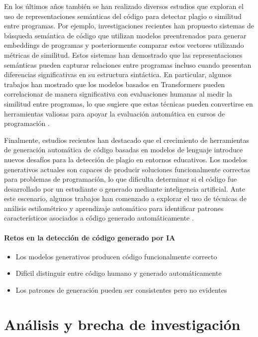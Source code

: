 En los últimos años también se han realizado diversos estudios que exploran el uso de representaciones semánticas del código para detectar plagio o similitud entre programas. Por ejemplo, investigaciones recientes han propuesto sistemas de búsqueda semántica de código que utilizan modelos preentrenados para generar embeddings de programas y posteriormente comparar estos vectores utilizando métricas de similitud. Estos sistemas han demostrado que las representaciones semánticas pueden capturar relaciones entre programas incluso cuando presentan diferencias significativas en su estructura sintáctica. En particular, algunos trabajos han mostrado que los modelos basados en Transformers pueden correlacionar de manera significativa con evaluaciones humanas al medir la similitud entre programas, lo que sugiere que estas técnicas pueden convertirse en herramientas valiosas para apoyar la evaluación automática en cursos de programación \cite{Ebrahim2024Semantic}.

Finalmente, estudios recientes han destacado que el crecimiento de herramientas de generación automática de código basadas en modelos de lenguaje introduce nuevos desafíos para la detección de plagio en entornos educativos. Los modelos generativos actuales son capaces de producir soluciones funcionalmente correctas para problemas de programación, lo que dificulta determinar si el código fue desarrollado por un estudiante o generado mediante inteligencia artificial. Ante este escenario, algunos trabajos han comenzado a explorar el uso de técnicas de análisis estilométrico y aprendizaje automático para identificar patrones característicos asociados a código generado automáticamente \cite{Ebrahim2023Source}.

\paragraph{Retos en la detección de código generado por IA}
\begin{itemize}
    \item Los modelos generativos producen código funcionalmente correcto
    \item Difícil distinguir entre código humano y generado automáticamente
    \item Los patrones de generación pueden ser consistentes pero no evidentes
\end{itemize}

\section{Análisis y brecha de investigación}

